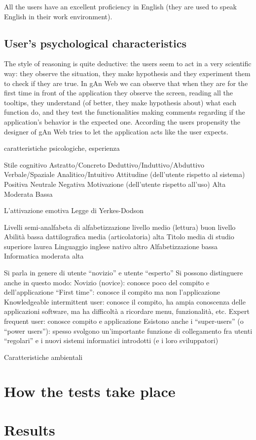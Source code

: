 All the users have an excellent proficiency in English (they are used to speak English in their work environment). 

\subsection{User's psychological characteristics }
The style of reasoning is quite deductive: the users seem to act in a very scientific way: they observe the situation, they make hypothesis and they experiment them to check if they are true. In gAn Web we can observe that when they are for the first time in front of the application they observe the screen, reading all the tooltips, they understand (of better, they make hypothesis about) what each function do, and they test the functionalities making comments regarding if the application's behavior is the expected one. According the users  propensity the designer of gAn Web tries to let the application acts like the user expects.   


 caratteristiche
psicologiche, esperienza

Stile cognitivo Astratto/Concreto
Deduttivo/Induttivo/Abduttivo
Verbale/Spaziale
Analitico/Intuitivo
Attitudine (dell’utente rispetto al sistema) Positiva
Neutrale
Negativa
Motivazione (dell’utente rispetto all’uso) Alta
Moderata
Bassa

L’attivazione emotiva
Legge di Yerkes-Dodson 


Livelli semi-analfabeta
di alfabetizzazione livello medio
(lettura) buon livello
Abilità bassa
dattilografica media
(articolatoria) alta
Titolo media
di studio superiore
laurea
Linguaggio inglese
nativo altro
Alfabetizzazione bassa
Informatica moderata
alta


Si parla in genere di utente “novizio” e utente
“esperto”
Si possono distinguere anche in questo modo:
Novizio (novice): conosce poco del compito e
dell’applicazione
“First time”: conosce il compito ma non l’applicazione
Knowledgeable intermittent user: conosce il compito, ha
ampia conoscenza delle applicazioni software, ma ha difficoltà
a ricordare menu, funzionalità, etc.
Expert frequent user: conosce compito e applicazione
Esistono anche i “super-users” (o “power users”):
spesso svolgono un’importante funzione di
collegamento fra utenti “regolari” e i nuovi sistemi
informatici introdotti (e i loro sviluppatori) 

Caratteristiche ambientali 

\section{How the tests take place} 

\section{Results}
